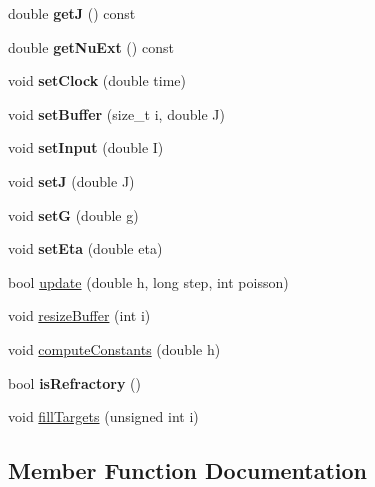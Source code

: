 \begin{DoxyCompactItemize}
double {\bfseries getJ} () const
\item 
\mbox{\label{classNeuron_a6d75ba1872e1cc93632805baf14e73a3}} 
double {\bfseries get\+Nu\+Ext} () const
\item 
\mbox{\label{classNeuron_af842772ffe709f3832a33077d468f002}} 
void {\bfseries set\+Clock} (double time)
\item 
\mbox{\label{classNeuron_a7807d64ac331e6ce7cca02c3d50c1f49}} 
void {\bfseries set\+Buffer} (size\+\_\+t i, double J)
\item 
\mbox{\label{classNeuron_adf1fa87decfaf5b0a0cdeda3c31f6274}} 
void {\bfseries set\+Input} (double I)
\item 
\mbox{\label{classNeuron_a2fadbcec4519684fc8b33de1ae6891f9}} 
void {\bfseries setJ} (double J)
\item 
\mbox{\label{classNeuron_a5e39733954fcc0ada96207b39fe93cfd}} 
void {\bfseries setG} (double g)
\item 
\mbox{\label{classNeuron_a14ca97731bce04fa5af8f6919e77e83e}} 
void {\bfseries set\+Eta} (double eta)
\item 
bool \hyperlink{classNeuron_a673bf2af51dc5ddd7e328bc00c235af2}{update} (double h, long step, int poisson)
\item 
void \hyperlink{classNeuron_ac60114eae02b3e9e8cd41a7684a1da1e}{resize\+Buffer} (int i)
\item 
void \hyperlink{classNeuron_aa4ac5a89e47de7e556c8f6e4f7936d38}{compute\+Constants} (double h)
\item 
\mbox{\label{classNeuron_a8a86e93b1619baf27aaf1dd1ff9fc799}} 
bool {\bfseries is\+Refractory} ()
\item 
void \hyperlink{classNeuron_a35f21c29541f5f1c429236fe8f3664c8}{fill\+Targets} (unsigned int i)
\end{DoxyCompactItemize}


\subsection{Member Function Documentation}
\mbox{\label{classNeuron_aa4ac5a89e47de7e556c8f6e4f7936d38}} 
